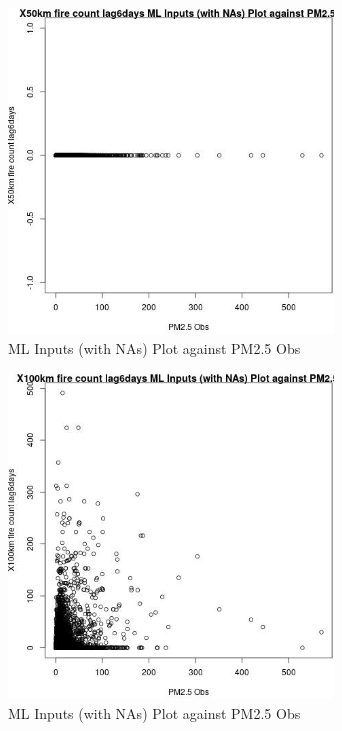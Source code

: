 \begin{figure} 
\centering  
\includegraphics[width=0.77\textwidth]{Code_Outputs/Report_ML_input_PM25_Step4_part_e_de_duplicated_aves_compiled_2019-05-14wNAs_X50km_fire_count_lag6daysvPM25_Obs.jpg} 
\caption{\label{fig:Report_ML_input_PM25_Step4_part_e_de_duplicated_aves_compiled_2019-05-14wNAsX50km_fire_count_lag6daysvPM25_Obs}ML Inputs (with NAs) Plot against PM2.5 Obs} 
\end{figure} 
 

\begin{figure} 
\centering  
\includegraphics[width=0.77\textwidth]{Code_Outputs/Report_ML_input_PM25_Step4_part_e_de_duplicated_aves_compiled_2019-05-14wNAs_X100km_fire_count_lag6daysvPM25_Obs.jpg} 
\caption{\label{fig:Report_ML_input_PM25_Step4_part_e_de_duplicated_aves_compiled_2019-05-14wNAsX100km_fire_count_lag6daysvPM25_Obs}ML Inputs (with NAs) Plot against PM2.5 Obs} 
\end{figure} 
 

